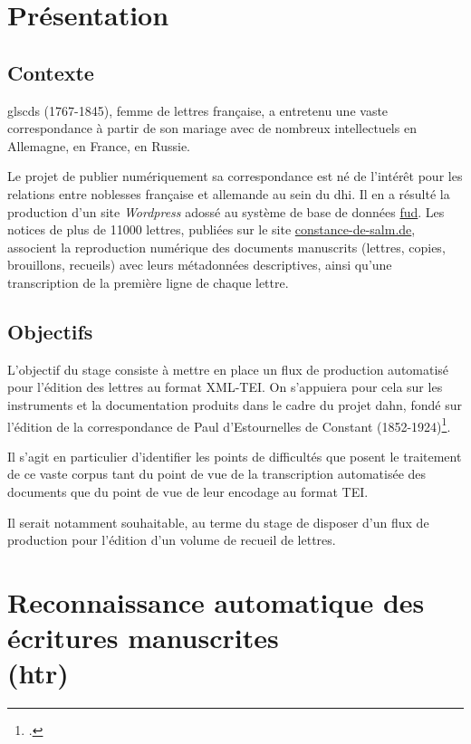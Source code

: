 \documentclass[a4paper,12pt,twoside]{book}
\begin{document}
	
	\tableofcontents
	
	\chapter*{Présentation}
	
		\section*{Contexte}
			gls{cds} (1767-1845), femme de lettres française, a entretenu une vaste correspondance à partir de son mariage avec de nombreux intellectuels en Allemagne, en France, en Russie.
	
			Le projet de publier numériquement sa correspondance est né de l'intérêt pour les relations entre noblesses française et allemande au sein du \gls{dhi}. Il en a résulté la production d'un site \textit{Wordpress} adossé au système de base de données \href{https://fud.uni-trier.de/}{\gls{fud}}. Les notices de plus de 11000 lettres, publiées sur le site \href{https://constance-de-salm.de}{constance-de-salm.de}, associent la reproduction numérique des documents manuscrits (lettres, copies, brouillons, recueils) avec leurs métadonnées descriptives, ainsi qu'une transcription de la première ligne de chaque lettre.
	
		\section*{Objectifs}
			L'objectif du stage consiste à mettre en place un flux de production automatisé pour l'édition des lettres au format XML-TEI. On s'appuiera pour cela sur les instruments et la documentation produits dans le cadre du projet \gls{dahn}, fondé sur l'édition de la correspondance de Paul d’Estournelles de Constant (1852-1924)\footcite{chiffoleauDAHNProject}.
			
			Il s'agit en particulier d'identifier les points de difficultés que posent le traitement de ce vaste corpus tant du point de vue de la transcription automatisée des documents que du point de vue de leur encodage au format TEI. 
			
			Il serait notamment souhaitable, au terme du stage de disposer d'un flux de production pour l'édition d'un volume de recueil de lettres.
				
	\chapter[HTR]{Reconnaissance automatique des écritures manuscrites \\ \large (\gls{htr})}
		
\end{document}
